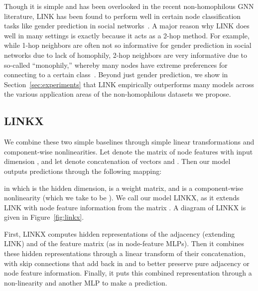 \documentclass{article}
\begin{document}
Though it is simple and has been overlooked in the recent non-homophilous GNN literature, LINK has been found to perform well in certain node classification tasks like gender prediction in social networks~\cite{altenburger2018monophily, altenburger2018node}. A major reason why LINK does well in many settings is exactly because it acts as a 2-hop method. For example, while 1-hop neighbors are often not so informative for gender prediction in social networks due to lack of homophily, 2-hop neighbors are very informative due to so-called ``monophily,'' whereby many nodes have extreme preferences for connecting to a certain class~\cite{altenburger2018monophily}. Beyond just gender prediction, we show in Section~\ref{sec:experiments} that LINK empirically outperforms many models across the various application areas of the non-homophilous datasets we propose. 






\subsection{LINKX}\label{sec:linkx_design}

We combine these two simple baselines through simple linear transformations and component-wise nonlinearities. Let  denote the matrix of node features with input dimension , and let  denote concatenation of vectors  and . Then our model outputs predictions  through the following mapping:

in which  is the hidden dimension,  is a weight matrix, and  is a component-wise nonlinearity (which we take to be ). We call our model LINKX, as it extends LINK with node feature information from the matrix . A diagram of LINKX is given in Figure~\ref{fig:linkx}.

First, LINKX computes hidden representations  of the adjacency (extending LINK) and  of the feature matrix (as in node-feature MLPs). Then it combines these hidden representations through a linear transform  of their concatenation, with skip connections that add back in  and  to better preserve pure adjacency or node feature information. Finally, it puts this combined representation through a non-linearity and another MLP to make a prediction.
\end{document}
